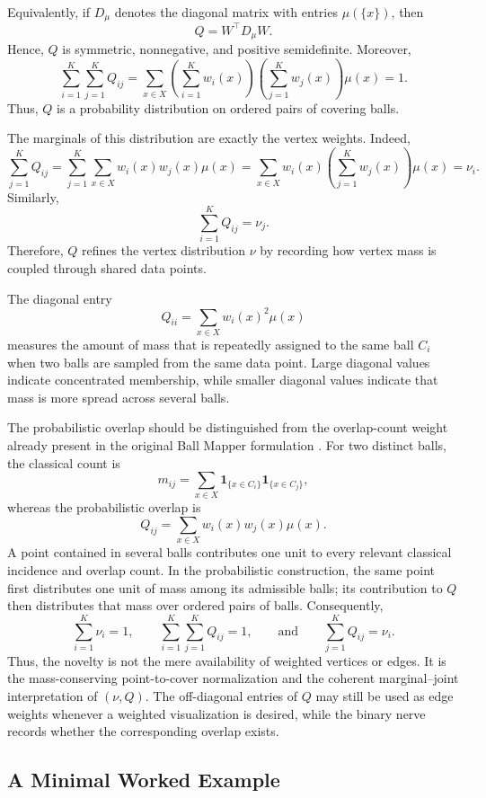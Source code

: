 \documentclass[9pt,a4paper,twocolumn,twoside]{extarticle}
\theoremstyle{definition}
\begin{document}
Equivalently, if $D_\mu$ denotes the diagonal matrix with entries $\mu(\{x\})$, then
\[
Q=W^\top D_\mu W.
\]
Hence, $Q$ is symmetric, nonnegative, and positive semidefinite. Moreover,
\[
\sum_{i=1}^K\sum_{j=1}^K Q_{ij} = \sum_{x\in X}\left(\sum_{i=1}^K w_i(x)\right)\left(\sum_{j=1}^K w_j(x)\right)\mu({x}) = 1.
\]
Thus, $Q$ is a probability distribution on ordered pairs of covering balls.

The marginals of this distribution are exactly the vertex weights. Indeed,
\[
\sum_{j=1}^K Q_{ij} =\sum_{j=1}^K\sum_{x\in X} w_i(x)w_j(x)\mu({x}) = \sum_{x\in X}w_i(x)\left(\sum_{j=1}^K w_j(x)\right)\mu({x}) = \nu_i.
\]
Similarly,
\[
\sum_{i=1}^K Q_{ij}=\nu_j.
\]
Therefore, $Q$ refines the vertex distribution $\nu$ by recording how vertex mass is coupled through shared data points.

The diagonal entry
\[
Q_{ii} = \sum_{x\in X}w_i(x)^2\mu({x})
\]
measures the amount of mass that is repeatedly assigned to the same ball $C_i$ when two balls are sampled from the same data point. Large diagonal values indicate concentrated membership, while smaller diagonal values indicate that mass is more spread across several balls.

The probabilistic overlap should be distinguished from the overlap-count weight already present in the original Ball Mapper formulation \cite{dlotko2019ballmapper}. For two distinct balls, the classical count is
\[
  m_{ij} =\sum_{x\in X}\mathbf{1}_{\{x\in C_i\}}\mathbf{1}_{\{x\in C_j\}},
\]
whereas the probabilistic overlap is
\[
  Q_{ij} = \sum_{x\in X}w_i(x)w_j(x)\mu(x).
\]
A point contained in several balls contributes one unit to every relevant classical incidence and overlap count. In the probabilistic construction, the same point first distributes one unit of mass among its admissible balls; its contribution to $Q$ then distributes that mass over ordered pairs of balls. Consequently,
\[
  \sum_{i=1}^{K}\nu_i=1,
  \qquad
  \sum_{i=1}^{K}\sum_{j=1}^{K}Q_{ij}=1,
  \qquad\text{and}\qquad
  \sum_{j=1}^{K}Q_{ij}=\nu_i.
\]
Thus, the novelty is not the mere availability of weighted vertices or edges. It is the mass-conserving point-to-cover normalization and the coherent marginal--joint interpretation of $(\nu,Q)$. The off-diagonal entries of $Q$ may still be used as edge weights whenever a weighted visualization is desired, while the binary nerve records whether the corresponding overlap exists.



\subsection{A Minimal Worked Example}
\end{document}

